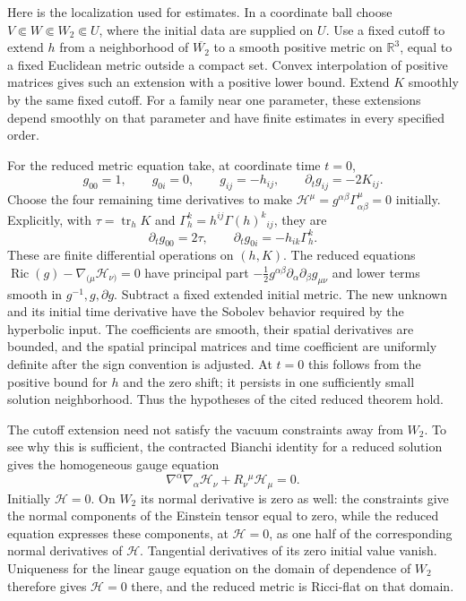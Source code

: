 \documentclass[
  english,
  11pt,
  reqno]{amsart}
\begin{document}
Here is the localization used for estimates. In a coordinate ball choose
\(V\Subset W\Subset W_2\Subset U\), where the initial data are supplied
on \(U\). Use a fixed cutoff to extend \(h\) from a neighborhood of
\(\overline{W_2}\) to a smooth positive metric on \(\mathbb R^3\), equal
to a fixed Euclidean metric outside a compact set. Convex interpolation
of positive matrices gives such an extension with a positive lower
bound. Extend \(K\) smoothly by the same fixed cutoff. For a family near
one parameter, these extensions depend smoothly on that parameter and
have finite estimates in every specified order.

For the reduced metric equation take, at coordinate time \(t=0\),%
 \[
g_{00}=1,\qquad g_{0i}=0,\qquad g_{ij}=-h_{ij},
\qquad
\partial_tg_{ij}=-2K_{ij}.
\] Choose the four remaining time derivatives to make
\(\mathcal H^\mu=g^{\alpha\beta}\Gamma^\mu_{\alpha\beta}=0\) initially.
Explicitly, with \(\tau=\operatorname{tr}_hK\) and
\(\Gamma_h^k=h^{ij}\Gamma(h)^k{}_{ij}\), they are%
 \[
\partial_tg_{00}=2\tau,\qquad
\partial_tg_{0i}=-h_{ik}\Gamma_h^k.
\] These are finite differential operations on \((h,K)\). The reduced
equations \(\operatorname{Ric}(g)-\nabla_{(\mu}\mathcal H_{\nu)}=0\)
have principal part
\(-\frac12g^{\alpha\beta}\partial_\alpha\partial_\beta g_{\mu\nu}\) and
lower terms smooth in \(g^{-1},g,\partial g\). Subtract a fixed extended
initial metric. The new unknown and its initial time derivative have the
Sobolev behavior required by the hyperbolic input. The coefficients are
smooth, their spatial derivatives are bounded, and the spatial principal
matrices and time coefficient are uniformly definite after the sign
convention is adjusted. At \(t=0\) this follows from the positive bound
for \(h\) and the zero shift; it persists in one sufficiently small
solution neighborhood. Thus the hypotheses of the cited reduced theorem
hold.

The cutoff extension need not satisfy the vacuum constraints away from
\(W_2\). To see why this is sufficient, the contracted Bianchi identity
for a reduced solution gives the homogeneous gauge equation%
 \[
\nabla^\alpha\nabla_\alpha\mathcal H_\nu
+R_\nu{}^\mu\mathcal H_\mu=0.
\] Initially \(\mathcal H=0\). On \(W_2\) its normal derivative is zero
as well: the constraints give the normal components of the Einstein
tensor equal to zero, while the reduced equation expresses these
components, at \(\mathcal H=0\), as one half of the corresponding normal
derivatives of \(\mathcal H\). Tangential derivatives of its zero
initial value vanish. Uniqueness for the linear gauge equation on the
domain of dependence of \(W_2\) therefore gives \(\mathcal H=0\) there,
and the reduced metric is Ricci-flat on that domain.
\end{document}
